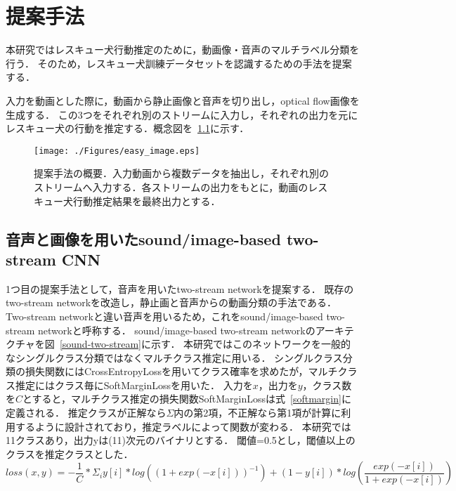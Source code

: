 \chapter{提案手法}
本研究ではレスキュー犬行動推定のために，動画像・音声のマルチラベル分類を行う．
そのため，レスキュー犬訓練データセットを認識するための手法を提案する．

入力を動画とした際に，動画から静止画像と音声を切り出し，optical flow画像を生成する．
この3つをそれぞれ別のストリームに入力し，それぞれの出力を元にレスキュー犬の行動を推定する．概念図を~\ref{easy_image}に示す．
\begin{figure}[H]
 \begin{center}
  \texttt{[image: ./Figures/easy\_image.eps]}
  \caption{提案手法の概要．入力動画から複数データを抽出し，それぞれ別のストリームへ入力する．各ストリームの出力をもとに，動画のレスキュー犬行動推定結果を最終出力とする．}
  \label{easy_image}
 \end{center}
\end{figure}

\section{音声と画像を用いたsound/image-based two-stream CNN}
1つ目の提案手法として，音声を用いたtwo-stream networkを提案する．
既存のtwo-stream networkを改造し，静止画と音声からの動画分類の手法である．
Two-stream networkと違い音声を用いるため，これをsound/image-based two-stream networkと呼称する．
sound/image-based two-stream networkのアーキテクチャを図~\ref{sound-two-stream}に示す．
本研究ではこのネットワークを一般的なシングルクラス分類ではなくマルチクラス推定に用いる．
シングルクラス分類の損失関数にはCrossEntropyLossを用いてクラス確率を求めたが，マルチクラス推定にはクラス毎にSoftMarginLossを用いた．
入力を$x$，出力を$y$，クラス数を$C$とすると，マルチクラス推定の損失関数SoftMarginLossは式~\ref{softmargin}に定義される．
推定クラスが正解なら$\Sigma$内の第2項，不正解なら第1項が計算に利用するように設計されており，推定ラベルによって関数が変わる．
本研究では11クラスあり，出力yは(11)次元のバイナリとする．
閾値=0.5とし，閾値以上のクラスを推定クラスとした．
\begin{equation}
\label{softmargin}
loss(x, y) = -\frac{1}{C} * \Sigma_{i} y[i] * log((1+exp(-x[i]))^{-1}) + (1 - y[i]) * log(\frac{exp(-x[i])}{1+exp(-x[i])})
\end{equation}

